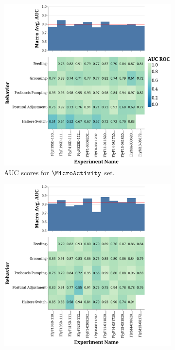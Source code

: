 \begin{figure}[htb!]
	\centering
	\begin{subfigure}[b]{0.5\linewidth}
		\centering\includegraphics[width=\linewidth]{figures/AUC_ROC-DActfiltered.pdf}
		\caption{AUC scores for $\MicroActivity$ set. \label{figure:AUC-ROC-Act}}
	\end{subfigure}%
	\hfill
	\begin{subfigure}[b]{0.5\linewidth}
		\centering\includegraphics[width=\linewidth]{figures/AUC_ROC-DAnnfiltered.pdf}

\end{subfigure}
\end{figure}
